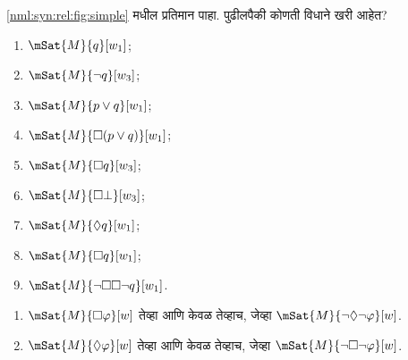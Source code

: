 \begin{prob}
  \ref{nml:syn:rel:fig:simple} मधील प्रतिमान पाहा. पुढीलपैकी
  कोणती विधाने खरी आहेत?
    \begin{enumerate}
    \item $\mSat{M}{q}[w_1]$;
    \item $\mSat{M}{\lnot q}[w_3]$;
    \item $\mSat{M}{p \lor q}[w_1]$;
    \item $\mSat{M}{\Box (p \lor q)}[w_1]$;
    \item $\mSat{M}{\Box q}[w_3]$;
    \item $\mSat{M}{\Box \bot}[w_3]$;
    \item $\mSat{M}{\Diamond q}[w_1]$;
    \item $\mSat{M}{\Box q}[w_1]$;
    \item $\mSat{M}{\lnot \Box\Box \lnot q}[w_1]$.
    \end{enumerate}
\end{prob}



\begin{prop}\label{nml:syn:trw:prop:dual}
  \begin{enumerate}
  \item $\mSat{M}{\Box \varphi}[w]$ तेव्हा आणि केवळ तेव्हाच, जेव्हा $\mSat{M}{\lnot\Diamond\lnot \varphi}[w]$.
  \item $\mSat{M}{\Diamond \varphi}[w]$ तेव्हा आणि केवळ तेव्हाच, जेव्हा $\mSat{M}{\lnot\Box\lnot \varphi}[w]$.
  \end{enumerate}
\end{prop}

